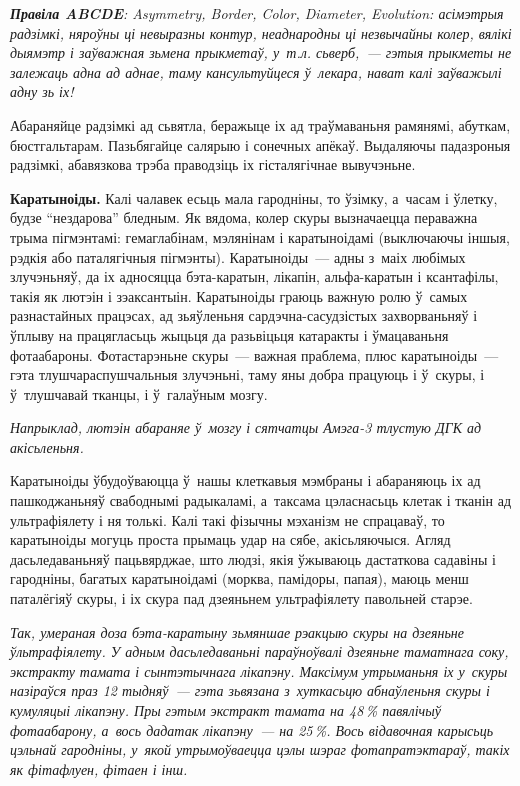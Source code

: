 \emph{\textbf{Правіла ABCDE}: Asymmetry, Border, Color, Diameter, Evolution: асімэтрыя радзімкі, няроўны ці невыразны контур, неаднародны ці незвычайны колер, вялікі дыямэтр і заўважная зьмена прыкметаў, у~т.л. сьверб,~--- гэтыя прыкметы не залежаць адна ад аднае, таму кансультуйцеся ў~лекара, нават калі заўважылі адну зь іх!}

Абараняйце радзімкі ад сьвятла, беражыце іх ад траўмаваньня рамянямі, абуткам, бюстгальтарам. Пазьбягайце салярыю і сонечных апёкаў. Выдаляючы падазроныя радзімкі, абавязкова трэба праводзіць іх гісталягічнае вывучэньне.

\textbf{Каратыноіды.} Калі чалавек есьць мала гародніны, то ўзімку, а~часам і ўлетку, будзе ``нездарова'' бледным. Як вядома, колер скуры вызначаецца пераважна трыма пігмэнтамі: гемаглабінам, мэлянінам і каратыноідамі (выключаючы іншыя, рэдкія або паталягічныя пігмэнты). Каратыноіды~--- адны з~маіх любімых злучэньняў, да іх адносяцца бэта-каратын, лікапін, альфа-каратын і ксантафілы, такія як лютэін і зэаксантыін. Каратыноіды граюць важную ролю ў~самых разнастайных працэсах, ад зьяўленьня сардэчна-сасудзістых захворваньняў і ўплыву на працягласьць жыцьця да разьвіцьця катаракты і ўмацаваньня фотаабароны. Фотастарэньне скуры~--- важная праблема, плюс каратыноіды~--- гэта тлушчараспушчальныя злучэньні, таму яны добра працуюць і ў~скуры, і ў~тлушчавай тканцы, і ў~галаўным мозгу.

\emph{Напрыклад, лютэін абараняе ў~мозгу і сятчатцы Амэга-3 тлустую ДГК ад акісьленьня.} 

Каратыноіды ўбудоўваюцца ў~нашы клеткавыя мэмбраны і абараняюць іх ад пашкоджаньняў свабоднымі радыкаламі, а~таксама цэласнасьць клетак і тканін ад ультрафіялету і ня толькі. Калі такі фізычны мэханізм не спрацаваў, то каратыноіды могуць проста прымаць удар на сябе, акісьляючыся. Агляд дасьледаваньняў пацьвярджае, што людзі, якія ўжываюць дастаткова садавіны і гародніны, багатых каратыноідамі (морква, памідоры, папая), маюць менш паталёгіяў скуры, і іх скура пад дзеяньнем ультрафіялету павольней старэе.

\emph{Так, умераная доза бэта-каратыну зьмяншае рэакцыю скуры на дзеяньне ўльтрафіялету. У адным дасьледаваньні параўноўвалі дзеяньне таматнага соку, экстракту тамата і сынтэтычнага лікапэну. Максімум утрыманьня іх у~скуры назіраўся праз 12 тыдняў~--- гэта зьвязана з~хуткасьцю абнаўленьня скуры і кумуляцыі лікапэну. Пры гэтым экстракт тамата на 48\,\% павялічыў фотаабарону, а~вось дадатак лікапэну~--- на 25\,\%. Вось відавочная карысьць цэльнай гародніны, у~якой утрымоўваецца цэлы шэраг фотапратэктараў, такіх як фітафлуен, фітаен і інш.}

